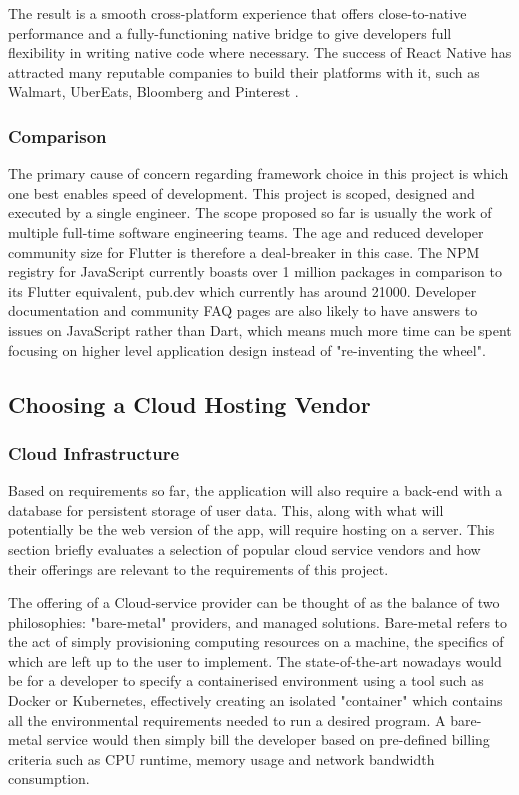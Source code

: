 The result is a smooth cross-platform experience that offers close-to-native performance and a fully-functioning native bridge to give developers full flexibility in writing native code where necessary. The success of React Native has attracted many reputable companies to build their platforms with it, such as Walmart, UberEats, Bloomberg and Pinterest \cite{rnplatforms}.

\subsubsection{Comparison}
The primary cause of concern regarding framework choice in this project is which one best enables speed of development. This project is scoped, designed and executed by a single engineer. The scope proposed so far is usually the work of multiple full-time software engineering teams. The age and reduced developer community size for Flutter is therefore a deal-breaker in this case. The NPM registry for JavaScript currently boasts over 1 million packages in comparison to its Flutter equivalent, pub.dev which currently has around 21000. Developer documentation and community FAQ pages are also likely to have answers to issues on JavaScript rather than Dart, which means much more time can be spent focusing on higher level application design instead of "re-inventing the wheel".

\subsection{Choosing a Cloud Hosting Vendor}
\subsubsection{Cloud Infrastructure}
Based on requirements so far, the application will also require a back-end with a database for persistent storage of user data. This, along with what will potentially be the web version of the app, will require hosting on a server. This section briefly evaluates a selection of popular cloud service vendors and how their offerings are relevant to the requirements of this project.

The offering of a Cloud-service provider can be thought of as the balance of two philosophies: "bare-metal" providers, and managed solutions. Bare-metal refers to the act of simply provisioning computing resources on a machine, the specifics of which are left up to the user to implement. The state-of-the-art nowadays would be for a developer to specify a containerised environment using a tool such as Docker or Kubernetes, effectively creating an isolated "container" which contains all the environmental requirements needed to run a desired program. A bare-metal service would then simply bill the developer based on pre-defined billing criteria such as CPU runtime, memory usage and network bandwidth consumption.

